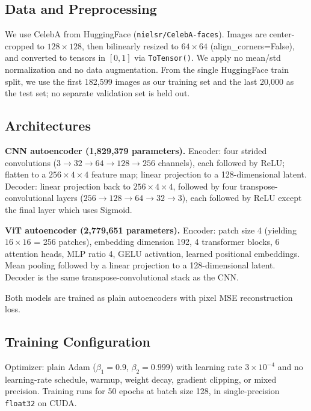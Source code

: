 \documentclass{article}
\begin{document}
\subsection{Data and Preprocessing}\label{app:data-preprocessing}

We use CelebA from HuggingFace (\texttt{nielsr/CelebA-faces}). Images
are center-cropped to $128\times 128$, then bilinearly resized to $64\times 64$
(align\_corners=False), and converted to tensors in $[0,1]$ via
\texttt{ToTensor()}. We apply no mean/std normalization and no data
augmentation. From the single HuggingFace train split, we use the first
182,599 images as our training set and the last 20,000 as the test set;
no separate validation set is held out.

\subsection{Architectures}\label{app:architectures}

\textbf{CNN autoencoder (1,829,379 parameters).} Encoder: four strided
convolutions ($3\to 32\to 64\to 128\to 256$ channels), each followed by ReLU;
flatten to a $256\times 4\times 4$ feature map; linear projection to a 128-dimensional
latent. Decoder: linear projection back to $256\times 4\times 4$, followed by four
transpose-convolutional layers ($256\to 128\to 64\to 32\to 3$), each followed
by ReLU except the final layer which uses Sigmoid.

\textbf{ViT autoencoder (2,779,651 parameters).} Encoder: patch size 4
(yielding $16\times 16$ = 256 patches), embedding dimension 192, 4 transformer
blocks, 6 attention heads, MLP ratio 4, GELU activation, learned
positional embeddings. Mean pooling followed by a linear projection to a
128-dimensional latent. Decoder is the same transpose-convolutional
stack as the CNN.

Both models are trained as plain autoencoders with pixel MSE
reconstruction loss.

\subsection{Training Configuration}\label{app:training-configuration}

Optimizer: plain Adam ($\beta_1=0.9$, $\beta_2=0.999$) with learning rate $3\times10^{-4}$ and no
learning-rate schedule, warmup, weight decay, gradient clipping, or
mixed precision. Training runs for 50 epochs at batch size 128, in
single-precision \texttt{float32} on CUDA.
\end{document}
